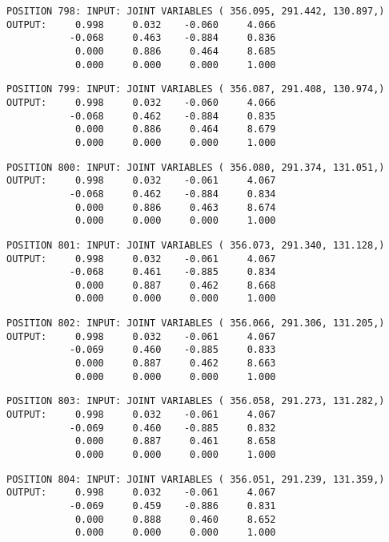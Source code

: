 \begin{verbatim}
POSITION 798: INPUT: JOINT VARIABLES ( 356.095, 291.442, 130.897,)
OUTPUT:     0.998     0.032    -0.060     4.066
           -0.068     0.463    -0.884     0.836
            0.000     0.886     0.464     8.685
            0.000     0.000     0.000     1.000
\end{verbatim} \pagebreak[1]\begin{verbatim}
POSITION 799: INPUT: JOINT VARIABLES ( 356.087, 291.408, 130.974,)
OUTPUT:     0.998     0.032    -0.060     4.066
           -0.068     0.462    -0.884     0.835
            0.000     0.886     0.464     8.679
            0.000     0.000     0.000     1.000
\end{verbatim} \pagebreak[1]\begin{verbatim}
POSITION 800: INPUT: JOINT VARIABLES ( 356.080, 291.374, 131.051,)
OUTPUT:     0.998     0.032    -0.061     4.067
           -0.068     0.462    -0.884     0.834
            0.000     0.886     0.463     8.674
            0.000     0.000     0.000     1.000
\end{verbatim} \pagebreak[1]\begin{verbatim}
POSITION 801: INPUT: JOINT VARIABLES ( 356.073, 291.340, 131.128,)
OUTPUT:     0.998     0.032    -0.061     4.067
           -0.068     0.461    -0.885     0.834
            0.000     0.887     0.462     8.668
            0.000     0.000     0.000     1.000
\end{verbatim} \pagebreak[1]\begin{verbatim}
POSITION 802: INPUT: JOINT VARIABLES ( 356.066, 291.306, 131.205,)
OUTPUT:     0.998     0.032    -0.061     4.067
           -0.069     0.460    -0.885     0.833
            0.000     0.887     0.462     8.663
            0.000     0.000     0.000     1.000
\end{verbatim} \pagebreak[1]\begin{verbatim}
POSITION 803: INPUT: JOINT VARIABLES ( 356.058, 291.273, 131.282,)
OUTPUT:     0.998     0.032    -0.061     4.067
           -0.069     0.460    -0.885     0.832
            0.000     0.887     0.461     8.658
            0.000     0.000     0.000     1.000
\end{verbatim} \pagebreak[1]\begin{verbatim}
POSITION 804: INPUT: JOINT VARIABLES ( 356.051, 291.239, 131.359,)
OUTPUT:     0.998     0.032    -0.061     4.067
           -0.069     0.459    -0.886     0.831
            0.000     0.888     0.460     8.652
            0.000     0.000     0.000     1.000
\end{verbatim} \pagebreak[1]\begin{verbatim}

\end{verbatim}
